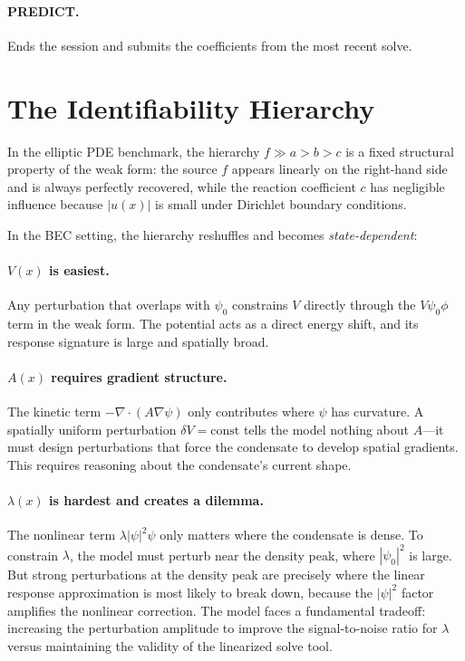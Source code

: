 \documentclass[11pt]{article}
\begin{document}
\paragraph{PREDICT.}
Ends the session and submits the coefficients from the most recent solve.

\section{The Identifiability Hierarchy}

In the elliptic PDE benchmark, the hierarchy $f \gg a > b > c$ is a fixed structural property of the weak form: the source $f$ appears linearly on the right-hand side and is always perfectly recovered, while the reaction coefficient $c$ has negligible influence because $|u(x)|$ is small under Dirichlet boundary conditions.

In the BEC setting, the hierarchy reshuffles and becomes \emph{state-dependent}:

\paragraph{$V(x)$ is easiest.} Any perturbation that overlaps with $\psi_0$ constrains $V$ directly through the $V\psi_0\phi$ term in the weak form. The potential acts as a direct energy shift, and its response signature is large and spatially broad.

\paragraph{$A(x)$ requires gradient structure.} The kinetic term $-\nabla\cdot(A\nabla\psi)$ only contributes where $\psi$ has curvature. A spatially uniform perturbation $\delta V = \mathrm{const}$ tells the model nothing about $A$---it must design perturbations that force the condensate to develop spatial gradients. This requires reasoning about the condensate's current shape.

\paragraph{$\lambda(x)$ is hardest and creates a dilemma.} The nonlinear term $\lambda|\psi|^2\psi$ only matters where the condensate is dense. To constrain $\lambda$, the model must perturb near the density peak, where $|\psi_0|^2$ is large. But strong perturbations at the density peak are precisely where the linear response approximation is most likely to break down, because the $|\psi|^2$ factor amplifies the nonlinear correction. The model faces a fundamental tradeoff: increasing the perturbation amplitude to improve the signal-to-noise ratio for $\lambda$ versus maintaining the validity of the linearized solve tool.
\end{document}
